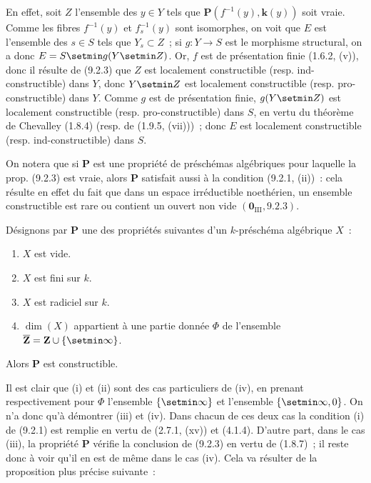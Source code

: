 En effet, soit $Z$ l'ensemble des $y\in Y$ tels que
$\boldsymbol{P}(f^{-1}(y),\boldsymbol{k}(y))$ soit vraie. Comme les fibres $f^{-1}(y)$ et
$f_s^{-1}(y)$ sont isomorphes, on voit que $E$ est l'ensemble des $s\in S$
tels que $Y_s\subset Z$~; si $g:Y\to S$ est le morphisme structural, on a
donc $E=S\setmin g(Y\setmin Z)$.
Or, $f$ est de présentation finie (1.6.2, (v)), donc il résulte de (9.2.3) que
$Z$ est localement constructible (resp. ind-constructible) dans $Y$, donc
$Y\setmin Z$ est localement constructible (resp. pro-constructible) dans $Y$. Comme
$g$ est de présentation finie, $g(Y\setmin Z)$ est localement constructible
(resp. pro-constructible) dans $S$, en vertu du théorème de Chevalley (1.8.4)
(resp. de (1.9.5, (vii)))~; donc $E$ est localement constructible
(resp. ind-constructible) dans $S$.

\begin{remark}[9.2.5]
\label{IV.9.2.5-fr}
On notera que si $\boldsymbol{P}$ est une propriété de préschémas algébriques pour
laquelle la prop. (9.2.3) est vraie, alors $\boldsymbol{P}$ satisfait aussi à la
condition (9.2.1, (ii))~: cela résulte en effet du fait que dans un espace
irréductible noethérien, un ensemble constructible est rare ou contient un
ouvert non vide $(\mathbf 0_{\mathrm{III}},9.2.3)$.
\end{remark}

\begin{proposition}[9.2.6]
\label{IV.9.2.6-fr}
Désignons par $\boldsymbol{P}$ une des propriétés suivantes d'un $k$-préschéma
algébrique $X$~:
\begin{enumerate}[label=\textup{(\roman*)}]
  \item $X$ est vide.
  \item $X$ est fini sur $k$.
  \item $X$ est radiciel sur $k$.
  \item $\dim(X)$ appartient à une partie donnée $\Phi$ de l'ensemble
  $\overline{\mathbf Z}=\mathbf Z\cup\{\setmin\infty\}$.
\end{enumerate}

Alors $\boldsymbol{P}$ est constructible.
\end{proposition}

Il est clair que (i) et (ii) sont des cas particuliers de (iv), en prenant
respectivement pour $\Phi$ l'ensemble $\{\setmin\infty\}$ et l'ensemble
$\{\setmin\infty,0\}$. On n'a donc qu'à démontrer (iii) et (iv). Dans chacun de ces
deux cas la condition (i) de (9.2.1) est remplie en vertu de (2.7.1, (xv)) et
(4.1.4). D'autre part, dans le cas (iii), la propriété $\boldsymbol{P}$ vérifie la
conclusion de (9.2.3) en vertu de (1.8.7)~; il reste donc à voir qu'il en est de
même dans le cas (iv). Cela va résulter de la proposition plus précise
suivante~:

